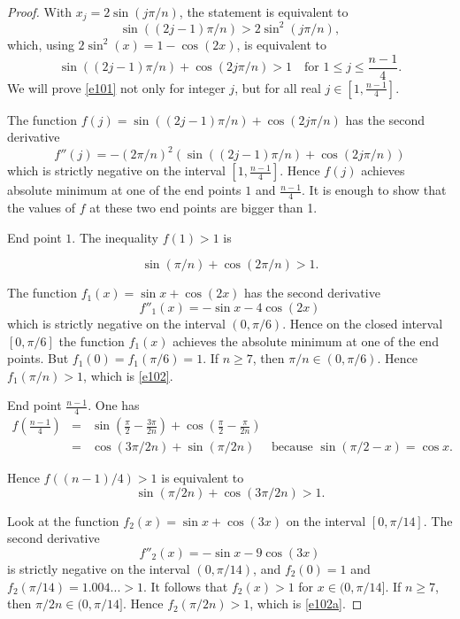 \documentclass{amsart}
\theoremstyle{definition}
\begin{document}
\begin{proof} With $x_j = 2 \sin (j \pi/n)$, the statement is equivalent to
$$\sin ((2j-1)\pi/n) >  2 \sin^2(j \pi/n) ,$$
 which,
using $2\sin^2(x)= 1- \cos(2x)$, is equivalent to
\begin{equation} \sin((2j-1)\pi/n) + \cos(2 j \pi/n) >1 \quad \text{for } 1 \le j \le \frac {n-1}4.
\label{e101}
\end{equation}
We will prove \eqref{e101} not only for integer $j$, but for all real $j \in [1, \frac {n-1}4]$.

The function $f(j)= \sin((2j-1)\pi/n) + \cos(2 j \pi/n)$ has the second derivative
$$ f''(j) = - (2\pi/n)^2 \left ( \sin((2j-1)\pi/n)  + \cos(2 j \pi/n) \right)$$
which is strictly negative on the interval $[1,\frac {n-1}4]$. Hence $f(j)$ achieves absolute minimum at one of the end points $1$ and $\frac {n-1}4$.
It is enough to show that the values of $f$ at these two end points are bigger than 1.

End point $1$. The inequality $f(1) > 1$ is

\begin{equation}
 \sin (\pi/n) + \cos (2 \pi/n)  >1. \label{e102}
 \end{equation}

The  function $f_1(x) = \sin x + \cos (2x)$ has the second derivative
$$ f''_1(x) = -\sin x - 4 \cos (2x)$$
which is strictly negative on the interval $(0,\pi/6)$. Hence on the closed interval $[0,\pi/6]$ the function $f_1(x)$ achieves the absolute minimum at one of the end points.
But $f_1(0)=f_1(\pi/6)=1$. If $n\ge 7$, then $\pi/n \in (0, \pi/6)$. Hence $f_1(\pi/n) >1$, which is \eqref{e102}.

End point $\frac {n-1}4$. One has 
\begin{eqnarray*} f\left (\frac {n-1}4\right)  & = &    \sin \left(\frac \pi 2 - \frac {3\pi}{2n}  \right) + \cos \left ( \frac \pi 2 - \frac \pi{2n}\right) \\
&=& \cos(3\pi/ 2n) + \sin (\pi/2n) \quad \text{ because } \sin(\pi /2 - x) = \cos x.
\end{eqnarray*}

Hence $f((n-1)/4) >1$ is equivalent to
\begin{equation}
 \sin (\pi/2n) + \cos (3 \pi/2n)  >1. \label{e102a}
 \end{equation}

Look at the function  $f_2(x) = \sin x + \cos (3x)$ on the interval $[0, \pi/14]$. The second derivative 
$$ f''_2(x) = -\sin x - 9 \cos (3x)$$
is strictly negative on the interval $(0,\pi/14)$, and $f_2(0)=1$ and $f_2(\pi/14)=1.004... >1$. It follows that $f_2(x) >1$ for $x \in (0, \pi/14]$.
If $n\ge 7$, then $\pi/2n \in (0, \pi/14]$. Hence $f_2(\pi/2n) >1$, which is \eqref{e102a}.
\end{proof}


\end{document}
